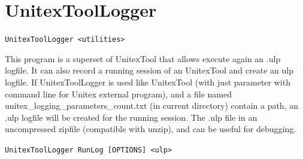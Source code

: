 \section{UnitexToolLogger}
\label{section-UnitexToolLogger}
\verb+UnitexToolLogger <utilities>+

\bigskip
\noindent This program is a superset of UnitexTool that allows execute again an
.ulp logfile.
It can also record a running session of an UnitexTool and create an ulp logfile.
If UnitexToolLogger is used like UnitexTool (with just parameter with command line for 
Unitex external program), and
a file named unitex\_logging\_parameters\_count.txt (in current directory) contain a path, 
an .ulp logfile will be created for the running session.
The .ulp file in an uncompressed zipfile (compatible with unzip), and can be useful for
debugging.

\bigskip
\verb+UnitexToolLogger RunLog [OPTIONS] <ulp>+

